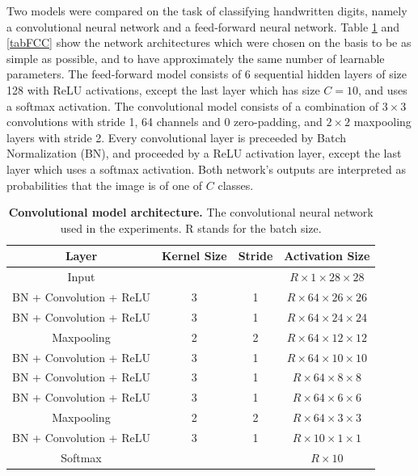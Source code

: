 \documentclass[a4paper, twoside]{article}
\begin{document}
Two models were compared on the task of classifying handwritten digits, namely a convolutional neural network and a feed-forward neural network. Table \ref{tabCNN} and \ref{tabFCC} show the network architectures which were chosen on the basis to be as simple as possible, and to have approximately the same number of learnable parameters. The feed-forward model consists of 6 sequential hidden layers of size 128 with ReLU activations, except the last layer which has size $C=10$, and uses a softmax activation. The convolutional model consists of a combination of $3 \times 3$ convolutions with stride 1, 64 channels and 0 zero-padding, and $2 \times 2$ maxpooling layers with stride 2. Every convolutional layer is preceeded by Batch Normalization (BN), and proceeded by a ReLU activation layer, except the last layer which uses a softmax activation. Both network's outputs are interpreted as probabilities that the image is of one of $C$ classes.

\begin{table}
\begin{center}
    \begin{tabular}{c | c | c | c}
    Layer & Kernel Size & Stride & Activation Size \\ 
    \hline \hline
    Input &  &  & $R \times 1 \times 28 \times 28$  \\ 
    BN + Convolution + ReLU & 3 & 1 & $R \times 64 \times 26 \times 26$  \\
    BN + Convolution + ReLU & 3 & 1 & $R \times 64 \times 24 \times 24$  \\ 
    Maxpooling & 2 & 2 & $R \times 64 \times 12 \times 12$  \\ 
    BN + Convolution + ReLU & 3 & 1 & $R \times 64 \times 10 \times 10$  \\ 
    BN + Convolution + ReLU & 3 & 1 & $R \times 64 \times 8 \times 8$  \\ 
    BN + Convolution + ReLU & 3 & 1 & $R \times 64 \times 6 \times 6$  \\
    Maxpooling & 2 & 2 & $R \times 64 \times 3 \times 3$  \\
    BN + Convolution + ReLU & 3 & 1 & $R \times 10 \times 1 \times 1$  \\
    Softmax &  &  & $R \times 10$  \\
    \end{tabular}\caption{\textbf{Convolutional model architecture.} The convolutional neural network used in the experiments. R stands for the batch size.}\label{tabCNN}
\end{center}
\end{table}
\end{document}
